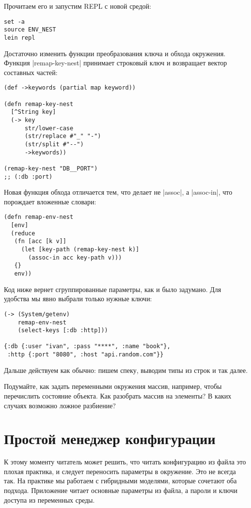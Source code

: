 Прочитаем его и запустим REPL с новой средой:

\begin{verbatim}
set -a
source ENV_NEST
lein repl
\end{verbatim}

Достаточно изменить функции преобразования ключа и обхода окружения. Функция
\spverb|remap-key-nest| принимает строковый ключ и возвращает вектор составных частей:

\begin{verbatim}
(def ->keywords (partial map keyword))

(defn remap-key-nest
  [^String key]
  (-> key
      str/lower-case
      (str/replace #"_" "-")
      (str/split #"--")
      ->keywords))

(remap-key-nest "DB__PORT")
;; (:db :port)
\end{verbatim}

Новая функция обхода отличается тем, что делает не \spverb|assoc|, а \spverb|assoc-in|, что
порождает вложенные словари:

\begin{verbatim}
(defn remap-env-nest
  [env]
  (reduce
   (fn [acc [k v]]
     (let [key-path (remap-key-nest k)]
       (assoc-in acc key-path v)))
   {}
   env))
\end{verbatim}

Код ниже вернет сгруппированные параметры, как и было задумано. Для удобства мы
явно выбрали только нужные ключи:

\begin{verbatim}
(-> (System/getenv)
    remap-env-nest
    (select-keys [:db :http]))

{:db {:user "ivan", :pass "****", :name "book"},
 :http {:port "8080", :host "api.random.com"}}
\end{verbatim}

Дальше действуем как обычно: пишем спеку, выводим типы из строк и так далее.

Подумайте, как задать переменными окружения массив, например, чтобы перечислить
состояние объекта. Как разобрать массив на элементы? В каких случаях возможно
ложное разбиение?

\section{Простой менеджер конфигурации}

К этому моменту читатель может решить, что читать конфигурацию из файла это
плохая практика, и следует переносить параметры в окружение. Это не всегда
так. На практике мы работаем с гибридными моделями, которые сочетают оба
подхода. Приложение читает основные параметры из файла, а пароли и ключи доступа
из переменных среды.

